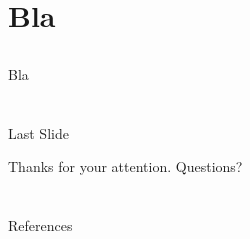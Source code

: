 \section[Bla]{Bla}
\subsection*{}

\begin{frame}{Bla}

\end{frame}




\section*{}

\begin{frame}{Last Slide}

{\centering

Thanks for your attention. Questions?

}

\end{frame}

\section*{}

\begin{frame}[allowframebreaks]{References}
\footnotesize


\end{frame}






